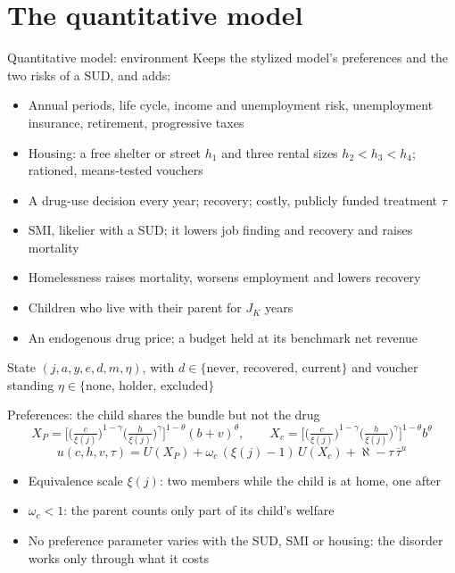 \documentclass[aspectratio=169,11pt]{beamer}
\begin{document}
\section{The quantitative model}

\begin{frame}{Quantitative model: environment}
Keeps the stylized model's preferences and the two risks of a SUD, and adds:
\begin{itemize}\setlength\itemsep{0.3em}
\item Annual periods, life cycle, income and unemployment risk, unemployment insurance, retirement, progressive taxes
\item Housing: a free shelter or street $h_1$ and three rental sizes $h_2<h_3<h_4$; rationed, means-tested vouchers
\item A drug-use decision every year; recovery; costly, publicly funded treatment $\tau$
\item SMI, likelier with a SUD; it lowers job finding and recovery and raises mortality
\item Homelessness raises mortality, worsens employment and lowers recovery
\item Children who live with their parent for $J_K$ years
\item An endogenous drug price; a budget held at its benchmark net revenue
\end{itemize}
State $(j,a,y,e,d,m,\eta)$, with $d\in\{$never, recovered, current$\}$ and voucher standing $\eta\in\{$none, holder, excluded$\}$
\end{frame}

\begin{frame}{Preferences: the child shares the bundle but not the drug}
\[
X_P=\Big[\Big(\tfrac{c}{\xi(j)}\Big)^{1-\gamma}\Big(\tfrac{h}{\xi(j)}\Big)^{\gamma}\Big]^{1-\theta}(b+v)^{\theta},
\qquad
X_c=\Big[\Big(\tfrac{c}{\xi(j)}\Big)^{1-\gamma}\Big(\tfrac{h}{\xi(j)}\Big)^{\gamma}\Big]^{1-\theta}b^{\theta}
\]
\[
u(c,h,v,\tau)=U(X_P)+\omega_c\,(\xi(j)-1)\,U(X_c)+\aleph-\tau\,\bar\tau^{u}
\]
\begin{itemize}\setlength\itemsep{0.35em}
\item Equivalence scale $\xi(j)$: two members while the child is at home, one after
\item $\omega_c<1$: the parent counts only part of its child's welfare
\item No preference parameter varies with the SUD, SMI or housing: the disorder works only through what it costs
\end{itemize}
\end{frame}
\end{document}
